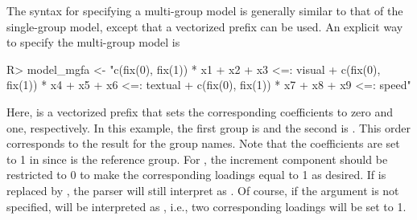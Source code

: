 \documentclass[nojss]{jss}
\begin{document}
The syntax for specifying a multi-group model is generally similar to that of the single-group model, except that a vectorized prefix can be used. An explicit way to specify the multi-group model is
\begin{Schunk}
\begin{Sinput}
R> model_mgfa <- "c(fix(0), fix(1)) * x1 + x2 + x3 <=: visual 
+                 c(fix(0), fix(1)) * x4 + x5 + x6 <=: textual
+                 c(fix(0), fix(1)) * x7 + x8 + x9 <=: speed"
\end{Sinput}
\end{Schunk}
Here,  is a vectorized prefix that sets the corresponding coefficients to zero and one, respectively. In this example, the first group is  and the second is . This order corresponds to the  result for the group names. Note that the coefficients are set to 1 in  since  is the reference group. For , the increment component should be restricted to 0 to make the corresponding loadings equal to 1 as desired. If  is replaced by , the  parser will still interpret  as . Of course, if the  argument is not specified,  will be interpreted as , i.e., two corresponding loadings will be set to 1. 
\end{document}
